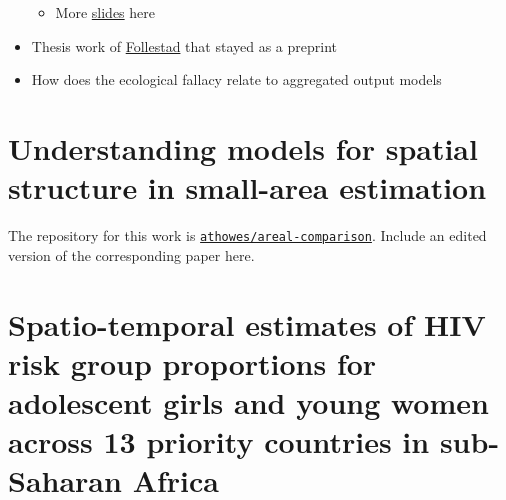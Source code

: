 \documentclass[a4paper, nobind]{templates/ociamthesis}
\providecommand{\tightlist}{%
  \setlength{\itemsep}{0pt}\setlength{\parskip}{0pt}}
\begin{document}
\begin{itemize}
  \begin{itemize}
  \tightlist
  \item
    More \href{https://informatique-mia.inrae.fr/reseau-resste/sites/default/files/2020-09/slides-Lindgren_Avignon2018.pdf}{slides} here
  \end{itemize}
\item
  Thesis work of \href{https://cds.cern.ch/record/639625/files/sis-2003-305.pdf}{Follestad} that stayed as a preprint
\item
  How does the ecological fallacy relate to aggregated output models
\end{itemize}

\hypertarget{understanding-models-for-spatial-structure-in-small-area-estimation}{%
\chapter*{Understanding models for spatial structure in small-area estimation}\label{understanding-models-for-spatial-structure-in-small-area-estimation}}

\adjustmtc
{}

The repository for this work is \href{https://github.com/athowes/areal-comparison}{\texttt{athowes/areal-comparison}}.
Include an edited version of the corresponding paper here.

\hypertarget{spatio-temporal-estimates-of-hiv-risk-group-proportions-for-adolescent-girls-and-young-women-across-13-priority-countries-in-sub-saharan-africa}{%
\chapter*{Spatio-temporal estimates of HIV risk group proportions for adolescent girls and young women across 13 priority countries in sub-Saharan Africa}\label{spatio-temporal-estimates-of-hiv-risk-group-proportions-for-adolescent-girls-and-young-women-across-13-priority-countries-in-sub-saharan-africa}}

\adjustmtc
{}
\end{document}

